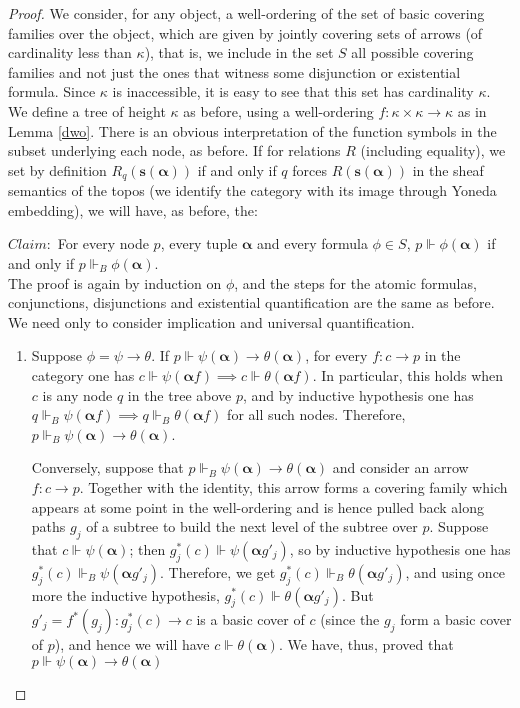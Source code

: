 \documentclass[a4paper,11pt]{article}
\theoremstyle{plain}
\theoremstyle{plain}
\theoremstyle{remark}
\begin{document}
\begin{proof}
 We consider, for any object, a well-ordering of the set of basic covering families over the object, which are given by jointly covering sets of arrows (of cardinality less than $\kappa$), that is, we include in the set $S$ all possible covering families and not just the ones that witness some disjunction or existential formula. Since $\kappa$ is inaccessible, it is easy to see that this set has cardinality $\kappa$. We define a tree of height $\kappa$ as before, using a well-ordering $f: \kappa \times \kappa \to \kappa$ as in Lemma \ref{dwo}. There is an obvious interpretation of the function symbols in the subset underlying each node, as before. If for relations $R$ (including equality), we set by definition $R_q(\mathbf{s}(\boldsymbol{\alpha}))$ if and only if $q$ forces $R(\mathbf{s}(\boldsymbol{\alpha}))$ in the sheaf semantics of the topos (we identify the category with its image through Yoneda embedding), we will have, as before, the:
 
 $Claim:$ For every node $p$, every tuple $\boldsymbol{\alpha}$ and every formula $\phi \in S$, $p \Vdash \phi(\boldsymbol{\alpha})$ if and only if $p \Vdash_B \phi(\boldsymbol{\alpha})$.\\

The proof is again by induction on $\phi$, and the steps for the atomic formulas, conjunctions, disjunctions and existential quantification are the same as before. We need only to consider implication and universal quantification.

\begin{enumerate}
  \item Suppose $\phi=\psi \to \theta$. If $p \Vdash \psi(\boldsymbol{\alpha}) \to \theta(\boldsymbol{\alpha})$, for every $f: c \to p$ in the category one has $c \Vdash \psi(\boldsymbol{\alpha} f) \implies c \Vdash \theta(\boldsymbol{\alpha} f)$. In particular, this holds when $c$ is any node $q$ in the tree above $p$, and by inductive hypothesis one has $q \Vdash_B \psi(\boldsymbol{\alpha} f) \implies q \Vdash_B \theta(\boldsymbol{\alpha} f)$ for all such nodes. Therefore, $p \Vdash_B \psi(\boldsymbol{\alpha}) \to \theta(\boldsymbol{\alpha})$.
  
  Conversely, suppose that $p \Vdash_B \psi(\boldsymbol{\alpha}) \to \theta(\boldsymbol{\alpha})$ and consider an arrow $f: c \to p$. Together with the identity, this arrow forms a covering family which appears at some point in the well-ordering and is hence pulled back along paths $g_j$ of a subtree to build the next level of the subtree over $p$. Suppose that $c \Vdash \psi(\boldsymbol{\alpha})$; then $g_j^*(c) \Vdash \psi(\boldsymbol{\alpha} g'_j)$, so by inductive hypothesis one has $g_j^*(c) \Vdash_B \psi(\boldsymbol{\alpha} g'_j)$. Therefore, we get $g_j^*(c) \Vdash_B \theta(\boldsymbol{\alpha} g'_j)$, and using once more the inductive hypothesis, $g_j^*(c) \Vdash \theta(\boldsymbol{\alpha} g'_j)$. But $g'_j=f^*(g_j): g_j^*(c) \to c$ is a basic cover of $c$ (since the $g_j$ form a basic cover of $p$), and hence we will have $c \Vdash \theta(\boldsymbol{\alpha})$. We have, thus, proved that $p \Vdash \psi(\boldsymbol{\alpha}) \to \theta(\boldsymbol{\alpha})$
  

\end{enumerate}
\end{proof}
\end{document}
